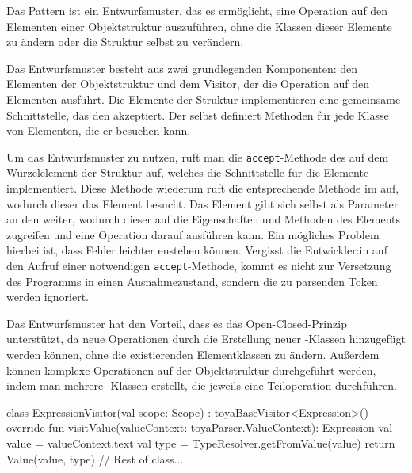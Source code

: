 Das \visitor Pattern ist ein Entwurfsmuster, das es ermöglicht, eine Operation auf den Elementen einer Objektstruktur auszuführen, ohne die Klassen dieser Elemente zu ändern oder die Struktur selbst zu verändern.

Das Entwurfsmuster besteht aus zwei grundlegenden Komponenten: den Elementen der Objektstruktur und dem Visitor, der die Operation auf den Elementen ausführt. Die Elemente der Struktur implementieren eine gemeinsame Schnittstelle, das den \visitor akzeptiert. Der \visitor selbst definiert Methoden für jede Klasse von Elementen, die er besuchen kann.

Um das Entwurfsmuster zu nutzen, ruft man die \texttt{accept}-Methode des \visitors auf dem Wurzelelement der Struktur auf, welches die Schnittstelle für die Elemente implementiert. Diese Methode wiederum ruft die entsprechende Methode im \visitor auf, wodurch dieser das Element besucht. Das Element gibt sich selbst als Parameter an den \visitor weiter, wodurch dieser auf die Eigenschaften und Methoden des Elements zugreifen und eine Operation darauf ausführen kann. Ein mögliches Problem hierbei ist, dass Fehler leichter enstehen können. Vergisst die Entwickler:in auf den Aufruf einer notwendigen \texttt{accept}-Methode, kommt es nicht zur Versetzung des Programms in einen Ausnahmezustand, sondern die zu parsenden Token werden ignoriert.

Das \visitor Entwurfsmuster hat den Vorteil, dass es das Open-Closed-Prinzip unterstützt, da neue Operationen durch die Erstellung neuer \visitor-Klassen hinzugefügt werden können, ohne die existierenden Elementklassen zu ändern. Außerdem können komplexe Operationen auf der Objektstruktur durchgeführt werden, indem man mehrere \visitor-Klassen erstellt, die jeweils eine Teiloperation durchführen.

\begin{ToyaCode}
class ExpressionVisitor(val scope: Scope) : toyaBaseVisitor<Expression>() {
    override fun visitValue(valueContext: toyaParser.ValueContext): Expression {
        val value = valueContext.text
        val type = TypeResolver.getFromValue(value)
        return Value(value, type)
    }
    // Rest of class...
}
\end{ToyaCode}